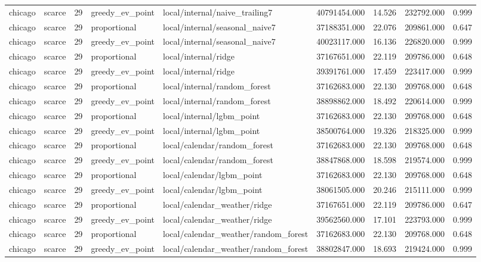 \begin{tabular}{llrllrrrr}
chicago & scarce & 29 & greedy\_ev\_point & local/internal/naive\_trailing7 & 40791454.000 & 14.526 & 232792.000 & 0.999 \\
chicago & scarce & 29 & proportional & local/internal/seasonal\_naive7 & 37188351.000 & 22.076 & 209861.000 & 0.647 \\
chicago & scarce & 29 & greedy\_ev\_point & local/internal/seasonal\_naive7 & 40023117.000 & 16.136 & 226820.000 & 0.999 \\
chicago & scarce & 29 & proportional & local/internal/ridge & 37167651.000 & 22.119 & 209786.000 & 0.648 \\
chicago & scarce & 29 & greedy\_ev\_point & local/internal/ridge & 39391761.000 & 17.459 & 223417.000 & 0.999 \\
chicago & scarce & 29 & proportional & local/internal/random\_forest & 37162683.000 & 22.130 & 209768.000 & 0.648 \\
chicago & scarce & 29 & greedy\_ev\_point & local/internal/random\_forest & 38898862.000 & 18.492 & 220614.000 & 0.999 \\
chicago & scarce & 29 & proportional & local/internal/lgbm\_point & 37162683.000 & 22.130 & 209768.000 & 0.648 \\
chicago & scarce & 29 & greedy\_ev\_point & local/internal/lgbm\_point & 38500764.000 & 19.326 & 218325.000 & 0.999 \\
chicago & scarce & 29 & proportional & local/calendar/random\_forest & 37162683.000 & 22.130 & 209768.000 & 0.648 \\
chicago & scarce & 29 & greedy\_ev\_point & local/calendar/random\_forest & 38847868.000 & 18.598 & 219574.000 & 0.999 \\
chicago & scarce & 29 & proportional & local/calendar/lgbm\_point & 37162683.000 & 22.130 & 209768.000 & 0.648 \\
chicago & scarce & 29 & greedy\_ev\_point & local/calendar/lgbm\_point & 38061505.000 & 20.246 & 215111.000 & 0.999 \\
chicago & scarce & 29 & proportional & local/calendar\_weather/ridge & 37167651.000 & 22.119 & 209786.000 & 0.647 \\
chicago & scarce & 29 & greedy\_ev\_point & local/calendar\_weather/ridge & 39562560.000 & 17.101 & 223793.000 & 0.999 \\
chicago & scarce & 29 & proportional & local/calendar\_weather/random\_forest & 37162683.000 & 22.130 & 209768.000 & 0.648 \\
chicago & scarce & 29 & greedy\_ev\_point & local/calendar\_weather/random\_forest & 38802847.000 & 18.693 & 219424.000 & 0.999 \\

\end{tabular}

